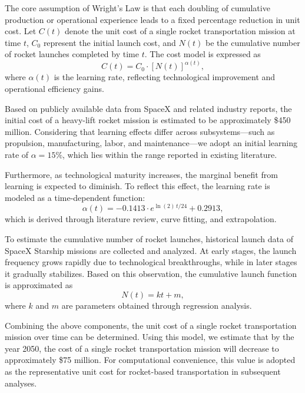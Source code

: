 \documentclass[demo]{mcmthesis}
\begin{document}
The core assumption of Wright’s Law is that each doubling of cumulative production or operational experience leads to a fixed percentage reduction in unit cost. 
Let $C(t)$ denote the unit cost of a single rocket transportation mission at time $t$, $C_0$ represent the initial launch cost, and $N(t)$ be the cumulative number of rocket launches completed by time $t$. 
The cost model is expressed as
\begin{equation}
C(t) = C_0 \cdot [N(t)]^{\alpha(t)},
\end{equation}
where $\alpha(t)$ is the learning rate, reflecting technological improvement and operational efficiency gains.

Based on publicly available data from SpaceX and related industry reports, the initial cost of a heavy-lift rocket mission is estimated to be approximately \$450 million. 
Considering that learning effects differ across subsystems—such as propulsion, manufacturing, labor, and maintenance—we adopt an initial learning rate of $\alpha = 15\%$, which lies within the range reported in existing literature.

Furthermore, as technological maturity increases, the marginal benefit from learning is expected to diminish. 
To reflect this effect, the learning rate is modeled as a time-dependent function:
\begin{equation}
\alpha(t) = -0.1413 \cdot e^{\ln(2)\, t / 24} + 0.2913,
\end{equation}
which is derived through literature review, curve fitting, and extrapolation.

To estimate the cumulative number of rocket launches, historical launch data of SpaceX Starship missions are collected and analyzed. 
At early stages, the launch frequency grows rapidly due to technological breakthroughs, while in later stages it gradually stabilizes. 
Based on this observation, the cumulative launch function is approximated as
\begin{equation}
N(t) = k t + m,
\end{equation}
where $k$ and $m$ are parameters obtained through regression analysis.

Combining the above components, the unit cost of a single rocket transportation mission over time can be determined. 
Using this model, we estimate that by the year 2050, the cost of a single rocket transportation mission will decrease to approximately \$75 million. 
For computational convenience, this value is adopted as the representative unit cost for rocket-based transportation in subsequent analyses.
\end{document}
